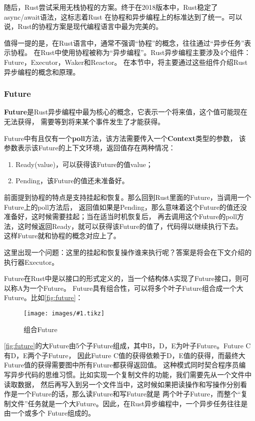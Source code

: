 \documentclass[supercite]{HustGraduPaper}
\newcommand{\cfig}[3]{
  \begin{figure}[htb]
    \centering
    \texttt{[image: images/\#1.tikz]}
    \caption{#3}
    \label{fig:#1}
  \end{figure}
}
\newcommand{\rfig}[1]{\autoref{fig:#1}}
\theoremstyle{definition}
\begin{document}
随后，Rust尝试采用无栈协程的方案。终于在2018版本中，Rust稳定了async/await语法，这标志着Rust
在协程和异步编程上的标准达到了统一。可以说，Rust的协程方案是现代编程语言中最为完美的。\par

值得一提的是，在Rust语言中，通常不强调“协程”的概念，往往通过“异步任务”表示协程。
在Rust中使用协程被称为“异步编程”。Rust异步编程主要涉及4个组件：Future，Executor，Waker和Reactor。
在本节中，将主要通过这些组件介绍Rust异步编程的概念和原理。\par

\subsubsection{Future}
\textbf{Future}是Rust异步编程中最为核心的概念，它表示一个将来值，这个值可能现在无法获得，
需要等到将来某个事件发生了才能获得。\par

Future中有且仅有一个\textbf{poll}方法，该方法需要传入一个\textbf{Context}类型的参数，
该参数表示该Future的上下文环境，返回值存在两种情况：

\begin{enumerate}
  \item Ready(value)，可以获得该Future的值value；
  \item Pending，该Future的值还未准备好。
\end{enumerate}

前面提到协程的特点是支持挂起和恢复。那么回到Rust里面的Future，当调用一个Future上的poll方法后，
返回值如果是Pending，那么意味着这个Future的值还没准备好，这时候需要挂起；当在适当时机恢复后，
再去调用这个Future的poll方法，这时候返回Ready，就可以获得该Future的值了，代码得以继续执行下去。
这样Future就和协程的概念对应上了。\par

这里出现一个问题：这里的挂起和恢复操作谁来执行呢？答案是将会在下文介绍的执行器Executor。\par

Future在Rust中是以接口的形式定义的，当一个结构体A实现了Future接口，则可以称A为一个Future。
Future具有组合性，可以将多个叶子Future组合成一个大Future。比如\rfig{future}：

\cfig{future}{0.4}{组合Future}

\rfig{future}的大Future由5个子Future组成，其中B，D，E为叶子Future。Future C有D，E两个子Future，
因此Future C值的获得依赖于D，E值的获得，而最终大Future值的获得需要图中所有Future都获得返回值。
这种模式同时契合程序员编写异步代码的思维习惯。比如实现一个复制文件的功能，我们需要先从一个文件中读取数据，
然后再写入到另一个文件当中，这时候如果把读操作和写操作分别看作是一个Future的话，那么读Future和写Future就是
两个叶子Future，而整个“复制文件”任务就是一个大Future。因此，在Rust异步编程中，一个异步任务往往是由一个或多个
Future组成的。\par
\end{document}
